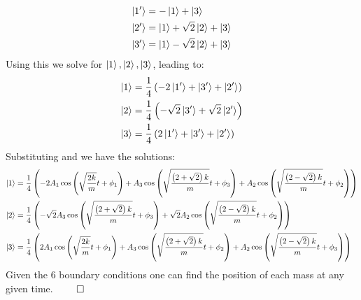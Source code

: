 \documentclass[10pt,twocoloumn]{article}
\begin{document}
\begin{align}
    \left| 1' \right\rangle &= -\left| 1 \right\rangle +\left| 3 \right\rangle\\
    \left| 2' \right\rangle &= \left| 1 \right\rangle +\sqrt2\left| 2 \right\rangle + \left| 3 \right\rangle\\
    \left| 3' \right\rangle &= \left| 1 \right\rangle -\sqrt2\left| 2 \right\rangle + \left| 3 \right\rangle
\end{align}
Using this we solve for $\left| 1 \right\rangle,\left| 2 \right\rangle,\left| 3 \right\rangle$, leading to:
\begin{align}
    \left| 1 \right\rangle &= \frac14\left(-2\left| 1' \right\rangle + \left| 3' \right\rangle + \left| 2' \right\rangle\right)\\
    \left| 2 \right\rangle &= \frac14\left(-\sqrt2\left| 3' \right\rangle+\sqrt2\left| 2' \right\rangle\right)\\
    \left| 3 \right\rangle &= \frac14 \left(2\left| 1' \right\rangle+\left| 3' \right\rangle+\left| 2' \right\rangle\right)
\end{align}
Substituting and we have the solutions:
\begin{align}
    \left| 1 \right\rangle &= \frac14\left(
    -2 A_1 \cos\left(\sqrt{\frac{2k}{m}} t + \phi_1\right) + A_3 \cos\left(\sqrt{\frac{\left(2+\sqrt2\right)k}{m}} t + \phi_3\right)
    + A_2\cos\left(\sqrt{\frac{\left(2-\sqrt2\right)k}{m}}t +\phi_2\right)
    \right)\\
    \left| 2 \right\rangle &=\frac14\left(
        - \sqrt2 A_3 \cos\left(\sqrt{\frac{\left(2+\sqrt2\right)k}{m}} t + \phi_3\right)
        + \sqrt2 A_2 \cos\left(\sqrt{\frac{\left(2-\sqrt2\right)k}{m}}t +\phi_2\right)
    \right)\\
    \left| 3 \right\rangle &= \frac14\left(
    2 A_1 \cos\left(\sqrt{\frac{2k}{m}} t + \phi_1\right) + A_3 \cos\left(\sqrt{\frac{\left(2+\sqrt2\right)k}{m}} t + \phi_2\right)
    + A_2\cos\left(\sqrt{\frac{\left(2-\sqrt2\right)k}{m}}t +\phi_3\right)
    \right)
\end{align}
Given the $6$ boundary conditions one can find the position of each mass at any given time. $\qed$
\end{document}
